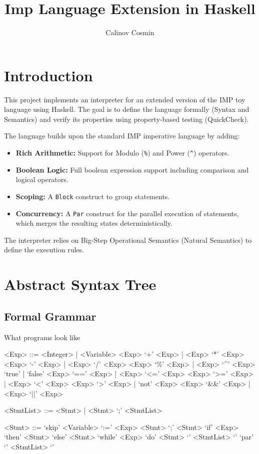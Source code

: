 \documentclass{article}
\title{Imp Language Extension in Haskell}
\author{Calinov Cosmin}
\begin{document}
	\maketitle
	
	\section{Introduction}
	This project implements an interpreter for an extended version of the IMP toy language using Haskell. The goal is to define the language formally (Syntax and Semantics) and verify its properties using property-based testing (QuickCheck).
	
	The language builds upon the standard IMP imperative language by adding:
	\begin{itemize}
		\item \textbf{Rich Arithmetic:} Support for Modulo (\texttt{\%}) and Power (\texttt{\^}) operators.
		\item \textbf{Boolean Logic:} Full boolean expression support including comparison and logical operators.
		\item \textbf{Scoping:} A \texttt{Block} construct to group statements.
		\item \textbf{Concurrency:} A \texttt{Par} construct for the parallel execution of statements, which merges the resulting states deterministically.
	\end{itemize}
	
	The interpreter relies on Big-Step Operational Semantics (Natural Semantics) to define the execution rules.
	
	\section{Abstract Syntax Tree}
	\subsection{Formal Grammar}
	\setlength{\grammarparsep}{10pt plus 1pt minus 1pt} 
	
	What programs look like
	\begin{grammar}
		<Exp> ::= <Integer> | <Variable> 
		 `+' <Exp> | <Exp> `*' <Exp>
		 `-' <Exp> | <Exp> `/' <Exp>
		 `\%' <Exp> | <Exp> `^' <Exp>
		\alt `true' | `false'
		 `==' <Exp> | <Exp> `<=' <Exp>
		 `>=' <Exp> | <Exp> `<' <Exp>
		 `>' <Exp> | `not' <Exp>
		 `&&' <Exp> | <Exp> `||' <Exp>
		
		<StmtList> ::= <Stmt> | <Stmt> `;' <StmtList>
		
		<Stmt> ::= `skip'
		\alt <Variable> `:=' <Exp>
		 `;' <Stmt>
		\alt `if' <Exp> `then' <Stmt> `else' <Stmt>
		\alt `while' <Exp> `do' <Stmt>
		\alt `{' <StmtList> `}'
		\alt `par' `{' <StmtList> `}'
	\end{grammar}
	
\end{document}
